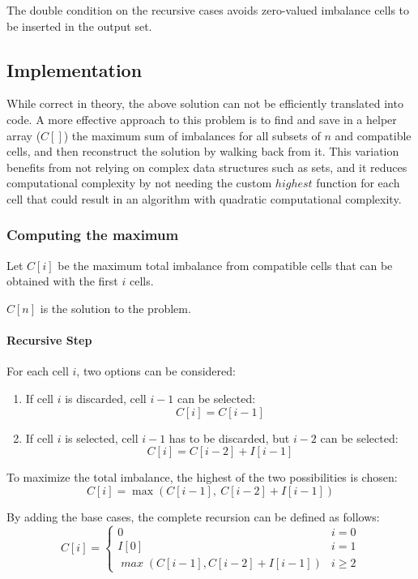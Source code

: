 The double condition on the recursive cases avoids zero-valued imbalance cells to be inserted in the output set.

\subsection{Implementation}

While correct in theory, the above solution can not be efficiently translated into code. A more effective approach to this problem is to find and save in a helper array ($C[]$) the maximum sum of imbalances for all subsets of $n$ and compatible cells, and then reconstruct the solution by walking back from it. This variation benefits from not relying on complex data structures such as sets, and it reduces computational complexity by not needing the custom $\mathit{highest}$ function for each cell that could result in an algorithm with quadratic computational complexity.

\subsubsection{Computing the maximum}
Let $C[i]$ be the maximum total imbalance from compatible cells that can be obtained with the first $i$ cells.

$C[n]$ is the solution to the problem.

\paragraph{Recursive Step}

For each cell $i$, two options can be considered:
\begin{enumerate}
    \item If cell $i$ is discarded, cell $i-1$ can be selected:
          \[
              C[i]=C[i-1]
          \]

    \item If cell $i$ is selected, cell $i-1$ has to be discarded, but $i-2$ can be selected:
          \[
              C[i]=C[i-2] + I[i-1]
          \]
\end{enumerate}

To maximize the total imbalance, the highest of the two possibilities is chosen:
\[
    C[i]=\max(C[i-1],\ C[i-2] + I[i-1])
\]

By adding the base cases, the complete recursion can be defined as follows:
\[
    C[i] = \begin{cases}
        0                                      & i=0      \\
        I[0]                                   & i=1      \\
        \mathit{\max}(C[i-1], C[i-2] + I[i-1]) & i \geq 2
    \end{cases}
\]


